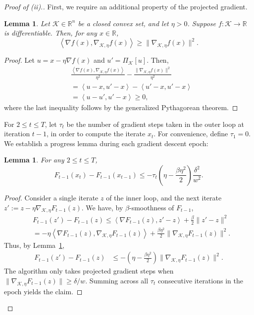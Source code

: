 \documentclass{article}
\def\reals{{\mathbb R}}
\def\norm#1{\mathopen\| #1 \mathclose\|}
\def\reals{{\mathbb R}}
\newcommand{\K}{\ensuremath{\mathcal K}}
\newcommand{\pa}[1]{\left(#1\right)}
\newcommand{\ang}[1]{\left<#1\right>}
\newcommand{\bra}[1]{\left[#1\right]}
\newcommand{\R}{\mathbb{R}}
\newtheorem{lemma}[theorem]{Lemma}
\renewcommand{\K}{\mathcal{K}}
\begin{document}
\begin{proof}[Proof of (ii).]
First, we require an additional property of the projected gradient.
\begin{lemma}
\label{lem:py}
Let $\K \in \R^n$ be a closed convex set, and let $\eta > 0$. Suppose $f:\K\to\reals$ is differentiable. Then, for any $x \in \R$,
\begin{equation*}
\ang{\nabla f(x), \nabla_{\K,\eta} f(x)} \geq \norm{ \nabla_{\K,\eta} f(x) }^2.
\end{equation*}
\end{lemma}
\begin{proof}
Let $u = x - \eta \nabla f(x)$ and $u' = \Pi_\K \bra{u}$. Then,
\begin{align*}
&\frac{\ang{\nabla f(x), \nabla_{\K,\eta} f(x)}}{\eta^2} - \frac{\norm{ \nabla_{\K,\eta} f(x) }^2}{\eta^2}\\
&= \ang{u-x,u'-x} - \ang{u'-x,u'-x} \\
&= \ang{u-u',u'-x} \geq 0,
\end{align*}
where the last inequality follows by the generalized Pythagorean theorem.
\end{proof}

For $2 \leq t \leq T$, let $\tau_t$ be the number of gradient steps taken in the outer loop at iteration $t-1$, in order to compute the iterate $x_t$.
For convenience, define $\tau_1 = 0$. We establish a progress lemma during each gradient descent epoch:

\begin{lemma}
\label{new-alg-progress}
For any $2 \leq t \leq T$,
\[ F_{t-1}(x_t) - F_{t-1}(x_{t-1}) \leq - \tau_t \pa{ \eta - \frac{\beta \eta^2}{2} } \frac{\delta^2}{w^2}. \]
\end{lemma}
\begin{proof}
Consider a single iterate $z$ of the inner loop, and the next iterate $z' := z - \eta \nabla_{\K,\eta} F_{t-1}(z)$. We have, by $\beta$-smoothness of $F_{t-1}$,
\begin{align*}
&F_{t-1}(z') - F_{t-1}(z) \leq \ang{\nabla F_{t-1}(z), z' - z} + \frac{\beta}{2}\norm{z' - z}^2 \\
&= -\eta\ang{\nabla F_{t-1}(z), \nabla_{\K,\eta} F_{t-1} (z)} + \frac{\beta \eta^2}{2}\norm{\nabla_{\K,\eta} F_{t-1} (z)}^2.
\end{align*}
Thus, by Lemma~\ref{lem:py},
\begin{align*}
F_{t-1}(z') - F_{t-1}(z) &\leq -\pa{\eta - \frac{\beta \eta^2}{2}} \norm{\nabla_{\K,\eta} F_{t-1} (z)}^2.
\end{align*}
The algorithm only takes projected gradient steps when $\norm{\nabla_{\K,\eta} F_{t-1} (z)} \geq \delta / w$. 
Summing across all $\tau_t$ consecutive iterations in the epoch yields the claim.
\end{proof}


\end{proof}
\end{document}
